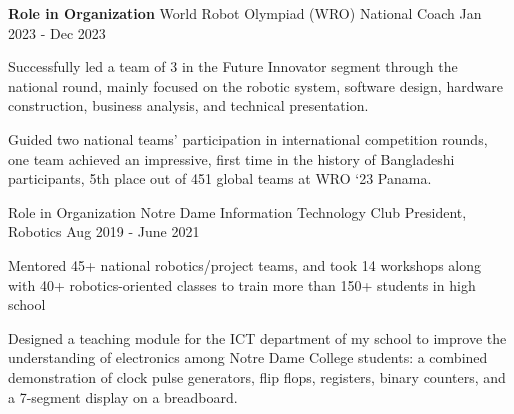

\begin{cventries}

  \cventryalt
    {\textbf{Role in Organization}} %
    {World Robot Olympiad (WRO)} %
    {National Coach} %
    {Jan 2023 - Dec 2023} %
    {
      \begin{cvitems} %
        \item {Successfully led a team of 3 in the Future Innovator segment through the national round, mainly focused on the robotic system, software design, hardware construction, business analysis, and technical presentation.}
        \item {Guided two national teams' participation in international competition rounds, one team achieved an impressive, first time in the history of Bangladeshi participants, 5th place out of 451 global teams at WRO ‘23 Panama.}
      \end{cvitems}
    }

  \cventryalt
    {Role in Organization} %
    { Notre Dame Information Technology Club} %
    {President, Robotics} %
    {Aug 2019 - June 2021} %
    {
      \begin{cvitems} %
        \item {Mentored 45+ national robotics/project teams, and took 14 workshops along with 40+ robotics-oriented classes to train more than 150+ students in high school}
        \item {Designed a teaching module for the ICT department of my school to improve the understanding of electronics among Notre Dame College students: a combined demonstration of clock pulse generators, flip flops, registers, binary counters, and a 7-segment display on a breadboard.}
      \end{cvitems}
    }

\end{cventries}
